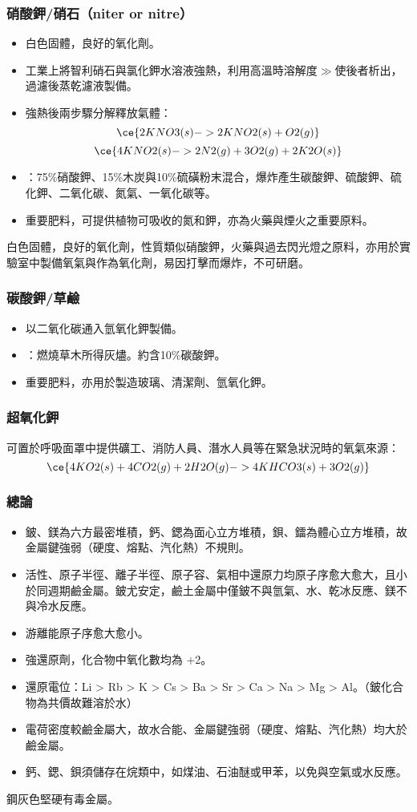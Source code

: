 \documentclass[a4paper,12pt]{report}
\begin{document}
\begin{itemize}
\begin{itemize}
\subsubsection{硝酸鉀/硝石（niter or nitre）}
\begin{itemize}
\item 白色固體，良好的氧化劑。
\item 工業上將智利硝石與氯化鉀水溶液強熱，利用高溫時溶解度$\gg$使後者析出，過濾後蒸乾濾液製備。
\item 強熱後兩步驟分解釋放氣體：
\[\ce{2KNO3(s) -> 2KNO2(s) + O2(g)}\]
\[\ce{4KNO2(s) -> 2N2(g) + 3O2(g) + 2K2O(s)}\]
\item {}：75\%硝酸鉀、15\%木炭與10\%硫磺粉末混合，爆炸產生碳酸鉀、硫酸鉀、硫化鉀、二氧化碳、氮氣、一氧化碳等。
\item 重要肥料，可提供植物可吸收的氮和鉀，亦為火藥與煙火之重要原料。
\end{itemize}
白色固體，良好的氧化劑，性質類似硝酸鉀，火藥與過去閃光燈之原料，亦用於實驗室中製備氧氣與作為氧化劑，易因打擊而爆炸，不可研磨。
\subsubsection{碳酸鉀/草鹼}
\begin{itemize}
\item 以二氧化碳通入氫氧化鉀製備。
\item {}：燃燒草木所得灰燼。約含10\%碳酸鉀。
\item 重要肥料，亦用於製造玻璃、清潔劑、氫氧化鉀。
\end{itemize}
\subsubsection{超氧化鉀}
可置於呼吸面罩中提供礦工、消防人員、潛水人員等在緊急狀況時的氧氣來源：
\[\ce{4KO2(s) + 4CO2(g) + 2H2O(g) -> 4KHCO3(s) + 3O2(g)}\]
\subsubsection{總論}
\begin{itemize}
\item 鈹、鎂為六方最密堆積，鈣、鍶為面心立方堆積，鋇、鐳為體心立方堆積，故金屬鍵強弱（硬度、熔點、汽化熱）不規則。
\item 活性、原子半徑、離子半徑、原子容、氣相中還原力均原子序愈大愈大，且小於同週期鹼金屬。鈹尤安定，鹼土金屬中僅鈹不與氫氣、水、乾冰反應、鎂不與冷水反應。
\item 游離能原子序愈大愈小。
\item 強還原劑，化合物中氧化數均為 +2。
\item 還原電位：Li > Rb > K > Cs > Ba > Sr > Ca > Na > Mg > Al。（鈹化合物為共價故難溶於水）
\item 電荷密度較鹼金屬大，故水合能、金屬鍵強弱（硬度、熔點、汽化熱）均大於鹼金屬。
\item 鈣、鍶、鋇須儲存在烷類中，如煤油、石油醚或甲苯，以免與空氣或水反應。
\end{itemize}
鋼灰色堅硬有毒金屬。

\end{itemize}
\end{itemize}
\end{document}
